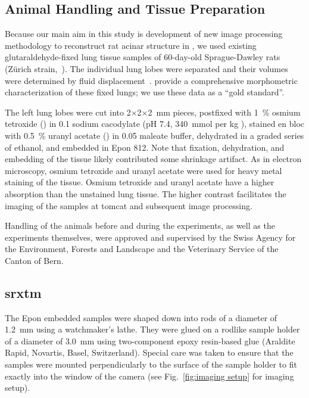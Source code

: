 \subsection[Animal Handling]{Animal Handling and Tissue Preparation}
Because our main aim in this study is development of new image processing methodology to reconstruct rat acinar structure in \threed, we used existing glutaraldehyde-fixed lung tissue samples of 60-day-old Sprague-Dawley rats (Zürich strain,~\cite{Tschanz2003}). The individual lung lobes were separated and their volumes were determined by fluid displacement~\cite{Scherle1970}. \citet{Tschanz2003} provide a comprehensive morphometric characterization of these fixed lungs; we use these data as a ``gold standard''.

The left lung lobes were cut into 2$\times$2$\times$\SI{2}{\milli\meter} pieces, postfixed with \SI{1}{\percent} osmium tetroxide () in \SI{0.1}{\Molar} sodium cacodylate (pH 7.4, \SI{340}{\mmol} per \si{\kilogram} ), stained en bloc with \SI{0.5}{\percent} uranyl acetate () in \SI{0.05}{\Molar} maleate buffer, dehydrated in a graded series of ethanol, and embedded in Epon 812. Note that fixation, dehydration, and embedding of the tissue likely contributed some shrinkage artifact. As in electron microscopy, osmium tetroxide and uranyl acetate were used for heavy metal staining of the tissue. Osmium tetroxide and uranyl acetate have a higher absorption than the unstained lung tissue. The higher contrast facilitates the imaging of the samples at \ac{tomcat} and subsequent image processing.

Handling of the animals before and during the experiments, as well as the experiments themselves, were approved and supervised by the Swiss Agency for the Environment, Forests and Landscape and the Veterinary Service of the Canton of Bern.

\subsection{srxtm}
The Epon embedded samples were shaped down into rods of a diameter of \SI{1.2}{\milli\meter} using a watchmaker's lathe. They were glued on a rodlike sample holder of a diameter of \SI{3.0}{\milli\meter} using two-component epoxy resin-based glue (Araldite Rapid, Novartis, Basel, Switzerland). Special care was taken to ensure that the samples were mounted perpendicularly to the surface of the sample holder to fit exactly into the window of the camera (see Fig.~\ref{fig:imaging setup} for imaging setup).

